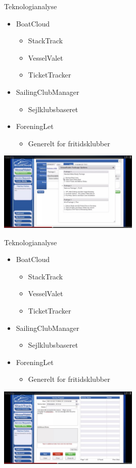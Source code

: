 \begin{frame}{Teknologianalyse}
  \begin{itemize}
    \item BoatCloud
    \begin{itemize}
      \item StackTrack
      \item VesselValet
      \item TicketTracker
    \end{itemize}
    \item SailingClubManager
    \begin{itemize}
      \item Sejlklubsbaseret
    \end{itemize}
    \item ForeningLet
    \begin{itemize}
      \item Generelt for fritidsklubber
    \end{itemize}
  \end{itemize}
  \includegraphics[width=0.5\textwidth]{images/VesselValet.jpg}
\end{frame}

\begin{frame}{Teknologianalyse}
  \begin{itemize}
    \item BoatCloud
    \begin{itemize}
      \item StackTrack
      \item VesselValet
      \item TicketTracker
    \end{itemize}
    \item SailingClubManager
    \begin{itemize}
      \item Sejlklubsbaseret
    \end{itemize}
    \item ForeningLet
    \begin{itemize}
      \item Generelt for fritidsklubber
    \end{itemize}
  \end{itemize}
  \includegraphics[width=0.5\textwidth]{images/TicketTracker.jpg}
\end{frame}

